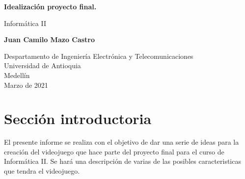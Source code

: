\documentclass{article}
\begin{document}
\begin{titlepage}
    \begin{center}
        \vspace*{1cm}
            
        \Huge
        \textbf{Idealización proyecto final.}
            
        \vspace{0.5cm}
        \LARGE
        Informática II
            
        \vspace{1.5cm}
            
        \textbf{Juan Camilo Mazo Castro}
            
        \vfill
            
        \vspace{0.8cm}
            
        \Large
        Despartamento de Ingeniería Electrónica y Telecomunicaciones\\
        Universidad de Antioquia\\
        Medellín\\
        Marzo de 2021
            
    \end{center}
\end{titlepage}

\tableofcontents
\newpage
\section{Sección introductoria}\label{intro}
El presente informe se realiza con el objetivo de dar una serie de ideas para la creación del videojuego que hace parte del proyecto final para el curso de Informática II. Se hará una descripción de varias de las posibles caracteristicas que tendra el videojuego.
\end{document}
